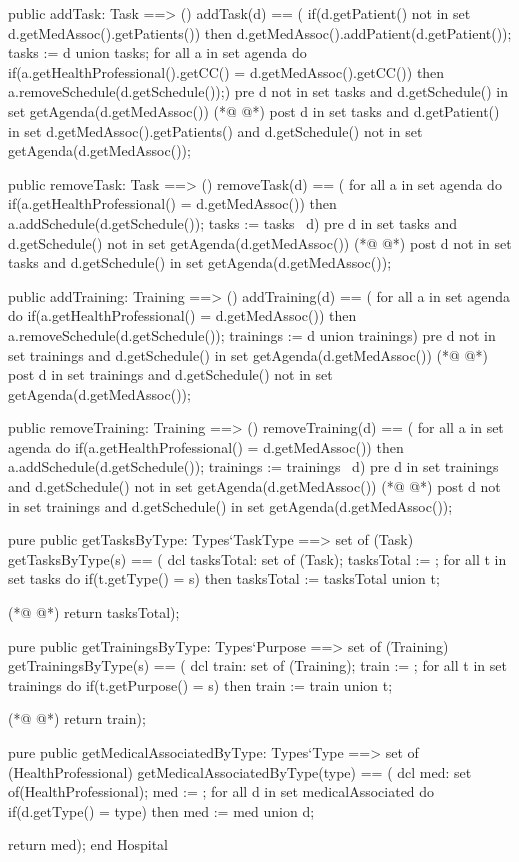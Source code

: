 \begin{vdmpp}[breaklines=true]
 public addTask: Task ==> ()
  addTask(d) == (
   if(d.getPatient() not in set d.getMedAssoc().getPatients())
    then d.getMedAssoc().addPatient(d.getPatient());
   tasks := {d} union tasks;
   for all a in set agenda do
    if(a.getHealthProfessional().getCC() = d.getMedAssoc().getCC())
      then a.removeSchedule(d.getSchedule());)
 pre d not in set tasks and d.getSchedule() in set getAgenda(d.getMedAssoc())
(*@
\label{removeTask:77}
@*)
 post d in set tasks and d.getPatient() in set d.getMedAssoc().getPatients() and d.getSchedule() not in set getAgenda(d.getMedAssoc());
  
 public removeTask: Task ==> ()
  removeTask(d) == (
   for all a in set agenda do
    if(a.getHealthProfessional() = d.getMedAssoc())
      then a.addSchedule(d.getSchedule());
   tasks := tasks \ {d})
 pre d in set tasks and d.getSchedule() not in set getAgenda(d.getMedAssoc())
(*@
\label{addTraining:86}
@*)
 post d not in set tasks and d.getSchedule() in set getAgenda(d.getMedAssoc());
 
 public addTraining: Training ==> ()
  addTraining(d) == (
   for all a in set agenda do
    if(a.getHealthProfessional() = d.getMedAssoc())
      then a.removeSchedule(d.getSchedule());
   trainings := {d} union trainings)
 pre d not in set trainings and d.getSchedule() in set getAgenda(d.getMedAssoc())
(*@
\label{removeTraining:95}
@*)
 post d in set trainings and d.getSchedule() not in set getAgenda(d.getMedAssoc());
  
 public removeTraining: Training ==> ()
  removeTraining(d) == (
   for all a in set agenda do
    if(a.getHealthProfessional() = d.getMedAssoc())
      then a.addSchedule(d.getSchedule());
   trainings := trainings \ {d})
 pre d in set trainings and d.getSchedule() not in set getAgenda(d.getMedAssoc())
(*@
\label{getTasksByType:104}
@*)
 post d not in set trainings and d.getSchedule() in set getAgenda(d.getMedAssoc());
 
 pure public getTasksByType: Types`TaskType ==> set of (Task)
  getTasksByType(s) == (
   dcl tasksTotal: set of (Task);
   tasksTotal := {};
   for all t in set tasks do
    if(t.getType() = s)
     then tasksTotal := tasksTotal union {t};
     
(*@
\label{getTrainingsByType:114}
@*)
   return tasksTotal);
              
 pure public getTrainingsByType: Types`Purpose ==> set of (Training)
  getTrainingsByType(s) == (
   dcl train: set of (Training);
   train := {};
   for all t in set trainings do
    if(t.getPurpose() = s)
     then train := train union {t};
     
(*@
\label{getMedicalAssociatedByType:124}
@*)
   return train);

 pure public getMedicalAssociatedByType: Types`Type ==> set of (HealthProfessional)
  getMedicalAssociatedByType(type) == (
   dcl med: set of(HealthProfessional);
   med := {};
   for all d in set medicalAssociated do
    if(d.getType() = type)
     then med := med union {d};
    
   return med);
end Hospital
\end{vdmpp}
